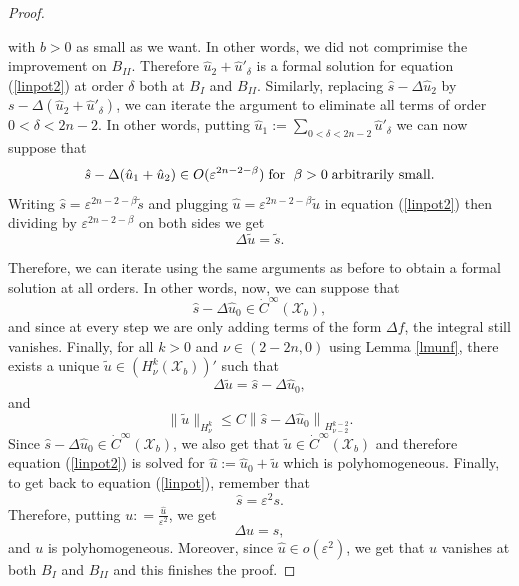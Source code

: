 \documentclass[a4paper,11pt]{article}
\begin{document}
\begin{proof}
\begin{itemize}
with $b>0$ as small as we want. In other words, we did not comprimise the improvement on $B_{II}$. Therefore $\hat u_2 + \hat u'_\delta$ is a formal solution for equation (\ref{linpot2}) at order $\delta$ both at $B_{I}$ and $B_{II}$. Similarly, replacing $\hat s - \Delta \hat u_2 $ by $s - \Delta (\hat u_2 + \hat u'_\delta)$, we can iterate the argument to eliminate all terms of order $0 < \delta < 2n -2$. In other words, putting $\hat u_1 := \sum_{0< \delta < 2n -2} \hat u'_\delta $ we can now suppose that
$$
\hat s - \Delta (\hat u_1 + \hat u_2 )  \in O(\varepsilon^{2n -2 - \beta }) \hspace{0.1cm}\text{for }\;\beta>0\;\text{arbitrarily small}.
$$
Writing $\hat s = \varepsilon^{2n -2 - \beta } \tilde s $ and plugging $\hat u = \varepsilon^{2n -2 - \beta } \tilde u$ in equation (\ref{linpot2}) then dividing by $\varepsilon^{2n -2 - \beta }$ on both sides we get 
$$
\Delta \tilde u = \tilde s.
$$
    \end{itemize}
Therefore, we can iterate using the same arguments as before to obtain a formal solution at all orders. In other words, now, we can suppose that 
$$
\hat s - \Delta \hat u_0\in \dot{C}^\infty(\mathcal{X}_b),
$$
and since at every step we are only adding terms of the form $\Delta f$, the integral still vanishes. Finally, for all $k >0$ and $\nu \in (2 -2n,0)$ using Lemma \ref{lmunf}, there exists a unique $\tilde u \in \left(H_{ \nu}^k\left(\mathcal{X}_b\right) \right)' $ such that 
$$
\Delta \tilde u = \hat s - \Delta \hat u_0,
$$
and 
$$
\|\tilde u\|_{H_{\nu}^k} \leq C\left\|\hat s - \Delta \hat u_0\right\|_{H_{\nu -2 }^{k-2}}.
$$
Since $\hat s - \Delta \hat u_0 \in \dot{C}^\infty(\mathcal{X}_b)$, we also get that $\tilde u \in \dot{C}^\infty(\mathcal{X}_b)$ and therefore equation (\ref{linpot2}) is solved for $\hat u := \hat u_0 + \tilde u$ which is polyhomogeneous. Finally, to get back to equation (\ref{linpot}), remember that 
$$
\hat s = \varepsilon^2 s.
$$
Therefore, putting $u : = \frac{\hat u}{\varepsilon^2}$, we get 
$$
\Delta u = s,
$$
and $u$ is polyhomogeneous. Moreover, since $\hat u \in o(\varepsilon^2)$, we get that $u$ vanishes at both $B_{I}$ and $B_{II}$ and this finishes the proof. 

     \end{proof}
\end{document}
